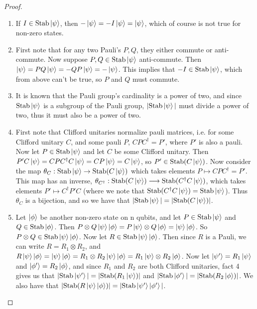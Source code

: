 \documentclass[12pt]{dalthesis}
\begin{document}
\begin{proof}
\hspace{20mm}
\begin{enumerate}
\item If $\-I \in \text{Stab}\ket{\psi}$, then $-\ket{\psi} =-I\ket{\psi} = \ket{\psi}$, which of course is not true for non-zero states.

\item First note that for any two Pauli's $P, Q$, they either commute or anti-commute. Now suppose $P, Q \in \text{Stab}\ket{\psi}$ anti-commute. Then $\ket{\psi} = PQ\ket{\psi} = -QP\ket{\psi} = -\ket{\psi}$. This implies that $-I \in \text{Stab}\ket{\psi}$, which from above can't be true, so $P$ and $Q$ must commute.

\item It is known that the Pauli group's cardinality is a power of two, and since $\text{Stab}\ket{\psi}$ is a subgroup of the Pauli group, $|\text{Stab}\ket{\psi}|$ must divide a power of two, thus it must also be a power of two.

\item First note that Clifford unitaries normalize pauli matrices, i.e. for some Clifford unitary $C$, and some pauli $P$, $CPC^{\dag} = P'$, where $P'$ is also a pauli. Now let $P \in \text{Stab}\ket{\psi}$ and let $C$ be some Clifford unitary. Then $P'C\ket{\psi} = CPC^{\dag}C\ket{\psi} = CP\ket{\psi} = C\ket{\psi}$, so $P' \in \text{Stab}(C\ket{\psi})$. Now consider the map $\theta_C : \text{Stab}\ket{\psi} \rightarrow \text{Stab}(C\ket{\psi})$ which takes elements $P \mapsto CPC^{\dag} = P'$. This map has an inverse, $\theta_{C^\dag}: \text{Stab}(C\ket{\psi}) \longrightarrow \text{Stab}(C^{\dag}C\ket{\psi})$, which takes elements $P' \mapsto C^{\dag}P'C$ (where we note that $\text{Stab}(C^{\dag}C\ket{\psi}) = \text{Stab}\ket{\psi}$). Thus $\theta_C$ is a bijection, and so we have that $|\text{Stab}\ket{\psi}| = |\text{Stab}(C\ket{\psi})|$.

\item Let $\ket{\phi}$ be another non-zero state on n qubits, and let $P \in \text{Stab}\ket{\psi}$ and $Q \in \text{Stab}\ket{\phi}$. Then $P \otimes Q \ket{\psi}\ket{\phi} = P\ket{\psi} \otimes Q\ket{\phi} = \ket{\psi}\ket{\phi}$. So $P \otimes Q \in \text{Stab}\ket{\psi}\ket{\phi}$. Now let $R \in \text{Stab}\ket{\psi}\ket{\phi}$. Then since $R$ is a Pauli, we can write $R = R_1 \otimes R_2$, and $R\ket{\psi}\ket{\phi} = \ket{\psi}\ket{\phi} = R_1 \otimes R_2 \ket{\psi}\ket{\phi} = R_1\ket{\psi} \otimes R_2\ket{\phi}$. Now let $\ket{\psi '} = R_1\ket{\psi}$ and $\ket{\phi '} = R_2\ket{\phi}$, and since $R_1$ and $R_2$ are both Clifford unitaries, fact 4 gives us that $|\text{Stab}\ket{\psi '}| = |\text{Stab}(R_1\ket{\psi})|$ and $|\text{Stab}\ket{\phi '}| = |\text{Stab}(R_2\ket{\phi})|$. We also have that $|\text{Stab}(R\ket{\psi}\ket{\phi})| = |\text{Stab}\ket{\psi '}\ket{\phi '}|$.



\end{enumerate}
\end{proof}
\end{document}
